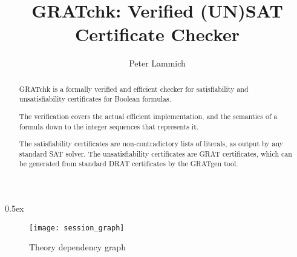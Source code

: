 \documentclass[10pt,a4paper]{article}
\begin{document}
\title{GRATchk: Verified (UN)SAT Certificate Checker}
\author{Peter Lammich}

\maketitle

\begin{abstract}
\noindent
GRATchk is a formally verified and efficient checker for satisfiability and 
unsatisfiability certificates for Boolean formulas.

The verification covers the actual efficient implementation, and 
the semantics of a formula down to the integer sequences that represents it.

The satisfiability certificates are non-contradictory lists of literals, 
as output by any standard SAT solver. The unsatisfiability certificates are 
GRAT certificates, which can be generated from standard DRAT certificates 
by the GRATgen tool.
\end{abstract}

\tableofcontents

\parindent 0pt
\parskip 0.5ex

\clearpage
\begin{figure}[h!]
\begin{center}
  \texttt{[image: session\_graph]}
\end{center}
\caption{Theory dependency graph}
\label{fig:thys}
\end{figure}
\clearpage



%
%
 
% 
% 
\end{document}
